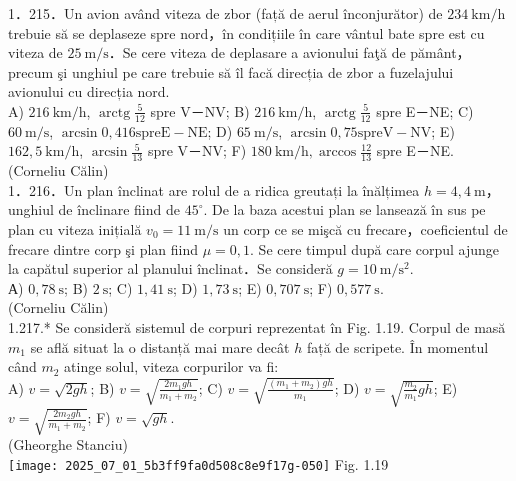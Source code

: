 {1．215．Un avion având viteza de zbor (față de aerul înconjurător) de $234 \mathrm{~km} / \mathrm{h}$ trebuie să se deplaseze spre nord，în condițiile în care vântul bate spre est cu viteza de $25 \mathrm{~m} / \mathrm{s}$．Se cere viteza de deplasare a avionului faţă de pământ，precum şi unghiul pe care trebuie să îl facă direcția de zbor a fuzelajului avionului cu direcția nord.\\ A) $216 \mathrm{~km} / \mathrm{h}$, $\operatorname{arctg} \frac{5}{12}$ spre V－NV; B) $216 \mathrm{~km} / \mathrm{h}$, $\operatorname{arctg} \frac{5}{12}$ spre E－NE; C) $60 \mathrm{~m} / \mathrm{s}$, $\arcsin 0,416 \mathrm{spre} \mathrm{E}-\mathrm{NE}$; D) $65 \mathrm{~m} / \mathrm{s}$, $\arcsin 0,75 \mathrm{spre} \mathrm{V}-\mathrm{NV}$; E) $162,5 \mathrm{~km} / \mathrm{h}$, $\arcsin \frac{5}{13}$ spre V－NV; F) $180 \mathrm{~km} / \mathrm{h}, \arccos \frac{12}{13}$ spre E－NE.\\ (Corneliu Călin)\\

1．216．Un plan înclinat are rolul de a ridica greutați la înălțimea $h=4,4 \mathrm{~m}$，unghiul de înclinare fiind de $45^{\circ}$. De la baza acestui plan se lansează în sus pe plan cu viteza inițială $v_{0}=11 \mathrm{~m} / \mathrm{s}$ un corp ce se mişcă cu frecare，coeficientul de frecare dintre corp şi plan fiind $\mu=0,1$. Se cere timpul după care corpul ajunge la capătul superior al planului înclinat．Se consideră $g=10 \mathrm{~m} / \mathrm{s}^{2}$.\\ А) $0,78 \mathrm{~s}$; B) $2 \mathrm{~s}$; C) $1,41 \mathrm{~s}$; D) $1,73 \mathrm{~s}$; E) $0,707 \mathrm{~s}$; F) $0,577 \mathrm{~s}$.\\ (Corneliu Călin)\\

1.217.* Se consideră sistemul de corpuri reprezentat în Fig. 1.19. Corpul de masă $m_{1}$ se află situat la o distanță mai mare decât $h$ față de scripete. În momentul când $m_{2}$ atinge solul, viteza corpurilor va fi:\\ A) $v=\sqrt{2 g h}$; B) $v=\sqrt{\frac{2 m_{1} g h}{m_{1}+m_{2}}}$; C) $v=\sqrt{\frac{\left(m_{1}+m_{2}\right) g h}{m_{1}}}$; D) $v=\sqrt{\frac{m_{2}}{m_{1}} g h}$; E) $v=\sqrt{\frac{2 m_{2} g h}{m_{1}+m_{2}}}$; F) $v=\sqrt{g h}$.\\ (Gheorghe Stanciu)\\ \texttt{[image: 2025\_07\_01\_5b3ff9fa0d508c8e9f17g-050]} Fig. 1.19\\

}
